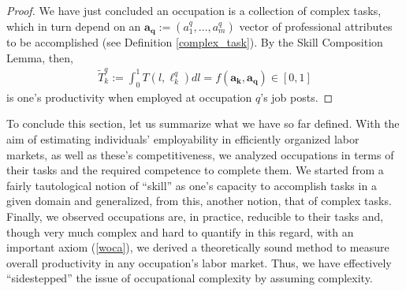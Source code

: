 \documentclass[hidelinks, nonatbib]{elsarticle}
\begin{document}
\begin{proof}
    We have just concluded an occupation is a collection of complex tasks, which in turn depend on an $\boldsymbol{a_q} := (a_{1}^{q},\dots, a_{m}^{q})$ vector of professional attributes to be accomplished (see Definition \ref{complex_task}). By the Skill Composition Lemma, then,
    \begin{gather}
        \tilde{T}_{k}^{q}
        :=
        \int_{0}^{1}
        T(l, \ell_{k}^{q})
        dl
        =
        f(\boldsymbol{a_k}, \boldsymbol{a_q})
        \in
        [0,1]
    \end{gather}
    is one's productivity when employed at occupation $q$'s job posts.
\end{proof}

To conclude this section, let us summarize what we have so far defined. With the aim of estimating individuals' employability in efficiently organized labor markets, as well as these's competitiveness, we analyzed occupations in terms of their tasks and the required competence to complete them. We started from a fairly tautological notion of ``skill'' as one's capacity to accomplish tasks in a given domain and generalized, from this, another notion, that of complex tasks. Finally, we observed occupations are, in practice, reducible to their tasks and, though very much complex and hard to quantify in this regard, with an important axiom (\ref{woca}), we derived a theoretically sound method to measure overall productivity in any occupation's labor market. Thus, we have effectively ``sidestepped'' the issue of occupational complexity by assuming complexity.
\end{document}

